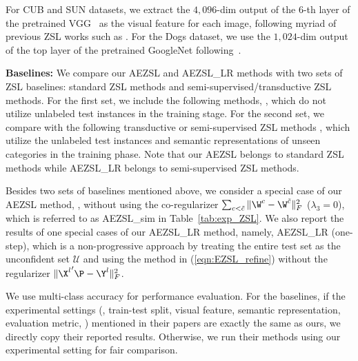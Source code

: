 \documentclass[journal]{IEEEtran}
\begin{document}
For CUB and SUN datasets, we extract the $4,096$-dim output of the $6$-th layer of the pretrained VGG~\cite{simonyan2014very} as the visual feature for each image, following myriad of previous ZSL works such as \cite{zhang2016zerose,zhang2016zero,zhang2015zero,bucher2016improving}. For the Dogs dataset, we use the $1,024$-dim output of the top layer of the pretrained
GoogleNet \cite{szegedy2015going} following~\cite{xian2016latent, akata2015evaluation}.

\noindent\textbf{Baselines:} We compare our AEZSL and AEZSL\_LR methods with two sets of ZSL baselines: standard ZSL methods and semi-supervised/transductive ZSL methods. For the first set, we include the following methods, \cite{xian2016latent,zhang2016zerose,bucher2016improving,fu2015zero,mensink2014costa,zhang2015zero,
akata2015evaluation,lampert2014attribute,changpinyo2016synthesized,norouzi2013zero,wang2016relational,changpinyo2016predicting}, which do not utilize unlabeled test instances in the training stage. For the second set, we compare with the following transductive or semi-supervised ZSL methods \cite{li2015semi, kodirov2015unsupervised, zhang2016zero, shojaee2016semi,li2015max,guo2016transductive,xu2017transductive}, which utilize the unlabeled test instances and semantic representations of unseen categories in the training phase. Note that our AEZSL belongs to standard ZSL methods while AEZSL\_LR belongs to semi-supervised ZSL methods.

Besides two sets of baselines mentioned above, we consider a special case of our AEZSL method, \ie, without using the co-regularizer $\sum_{c<\tilde{c}}\|\W^c-\W^{\tilde{c}}\|_F^2$ ($\lambda_3=0$), which is referred to as AEZSL\_sim in Table~\ref{tab:exp_ZSL}. We also report the results of one special cases of our AEZSL\_LR method, namely, AEZSL\_LR (one-step), which is a non-progressive approach by treating the entire test set as the unconfident set $\mathcal{U}$ and using the method in (\ref{eqn:EZSL_refine}) without the regularizer $\|{\X^l}'\P-\Y^l\|_F^2$.

We use multi-class accuracy for performance evaluation. For the baselines, if the experimental settings (\ie, train-test split, visual feature, semantic representation, evaluation metric, \etc) mentioned in their papers are exactly the same as ours, we directly copy their reported results. Otherwise, we run their methods using our experimental setting for fair comparison.
\end{document}
